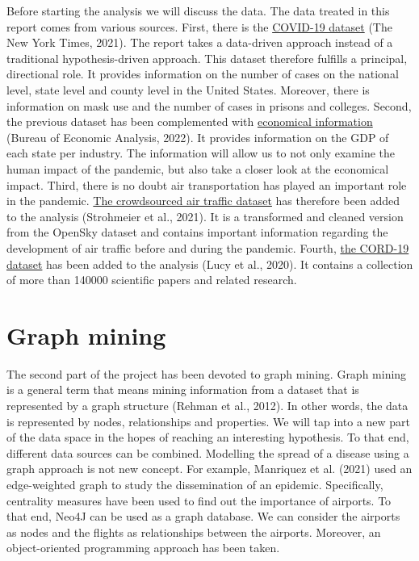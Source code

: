 \documentclass[10pt, a4paper, twocolumn]{article} %
\begin{document}
Before starting the analysis we will discuss the data. The data treated in this report comes from various sources. First, there is the \href{https://github.com/nytimes/covid-19-data}{COVID-19 dataset} (The New York Times, 2021). The report takes a data-driven approach instead of a traditional hypothesis-driven approach. This dataset therefore fulfills a principal, directional role. It provides information on the number of cases on the national level, state level and county level in the United States. Moreover, there is information on mask use and the number of cases in prisons and colleges. 
Second, the previous dataset has been complemented with \href{https://apps.bea.gov/regional/downloadzip.cfm}{economical information} (Bureau of Economic Analysis, 2022). It provides information on the GDP of each state per industry. The information will allow us to not only examine the human impact of the pandemic, but also take a closer look at the economical impact.
Third, there is no doubt air transportation has played an important role in the pandemic. \href{https://zenodo.org/record/6411336\#.YmO_gS8RrzU}{The crowdsourced air traffic dataset} has therefore been added to the analysis (Strohmeier et al., 2021). It is a transformed and cleaned version from the OpenSky dataset and contains important information regarding the development of air traffic before and during the pandemic.
Fourth, \href{https://github.com/allenai/cord19}{the CORD-19 dataset} has been added to the analysis (Lucy et al., 2020). It contains a collection of more than 140000 scientific papers and related research.

\section{Graph mining}

The second part of the project has been devoted to graph mining. Graph mining is a general term that means mining information from a dataset that is represented by a graph structure (Rehman et al., 2012). In other words, the data is represented by nodes, relationships and properties. We will tap into a new part of the data space in the hopes of reaching an interesting hypothesis. To that end, different data sources can be combined. Modelling the spread of a disease using a graph approach is not new concept. For example, Manriquez et al. (2021) used an edge-weighted graph to study the dissemination of an epidemic. Specifically, centrality measures have been used to find out the importance of airports. To that end, Neo4J can be used as a graph database. We can consider the airports as nodes and the flights as relationships between the airports. Moreover, an object-oriented programming approach has been taken.
\end{document}
